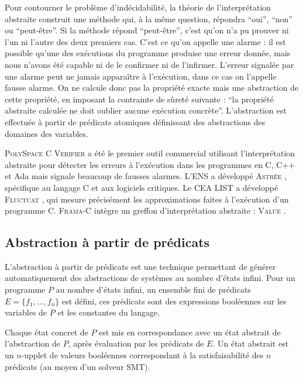 \documentclass[french]{spimufcphdthesis}
\begin{document}
Pour contourner le problème d’indécidabilité, la théorie de l’interprétation
abstraite construit une méthode qui, à la même question, répondra ``oui'',
``non'' ou ``peut-être''. Si la méthode répond ``peut-être'', c’est qu’on n’a pu
prouver ni l’un ni l’autre des deux premiers cas. C’est ce qu’on appelle une
alarme : il est possible qu’une des exécutions du programme produise une erreur
donnée, mais nous n’avons été capable ni de le confirmer ni de l’infirmer.
L’erreur signalée par une alarme peut ne jamais apparaître à l’exécution, dans
ce cas on l’appelle fausse alarme. On ne calcule donc pas la propriété exacte
mais une abstraction de cette propriété, en imposant la contrainte de sûreté
suivante : ``la propriété abstraite calculée ne doit oublier aucune exécution
concrète''. L'abstraction est effectuée à partir de prédicats atomiques
définissant des abstractions des domaines des variables.

\textsc{PolySpace C Verifier} \cite{PolySpace} a été le premier outil commercial
utilisant l'interprétation abstraite pour détecter les erreurs à l'exécution
dans les programmes en C, C++ et Ada mais signale beaucoup de fausses alarmes.
L'ENS a développé \textsc{Astrée} \cite{ASTREE}, spécifique au langage C et aux
logiciels critiques. Le CEA LIST a développé \textsc{Fluctuat} \cite{Fluctuat},
qui mesure précisément les approximations faites à l'exécution d'un programme C.
\textsc{Frama-C} intègre un greffon d'interprétation abstraite : \textsc{Value}
\cite{Value}.



\subsection{Abstraction à partir de prédicats}
\label{sec:abstraction-predicats}

L'abstraction à partir de prédicats \cite{predicate-abstraction} est une
technique permettant de générer automatiquement des abstractions de systèmes au
nombre d'états infini. Pour un programme $P$ au nombre d'états infini, un
ensemble fini de prédicats $E = \{f_1, ..., f_n\}$ est défini, ces prédicats
sont des expressions booléennes sur les variables de $P$ et les constantes du
langage.

Chaque état concret de $P$ est mis en correspondance avec un état abstrait de
l'abstraction de $P$, après évaluation par les prédicats de $E$. Un état
abstrait est un $n$-upplet de valeurs booléennes correspondant à la
satisfaisabilité des $n$ prédicats (au moyen d'un solveur SMT).
\end{document}

